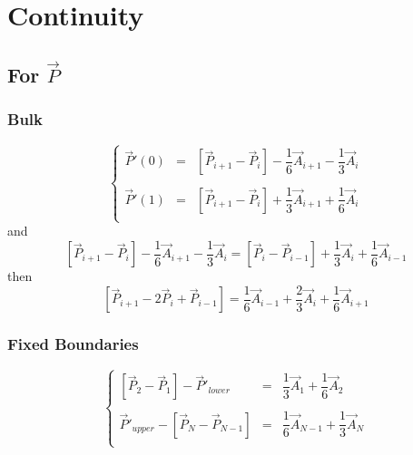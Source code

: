 \documentclass[aps,12pt]{revtex4}
\begin{document}
\section{Continuity}

\subsection{For $\vec{P}$}

\subsubsection{Bulk}

\begin{equation}
\left\lbrace
\begin{array}{rcl}
	\vec{P}'(0) & = & \left[\vec{P}_{i+1}-\vec{P}_i\right] - \dfrac{1}{6} \vec{A}_{i+1} - \dfrac{1}{3}\vec{A}_{i} \\
	\\
	\vec{P}'(1) & = & \left[\vec{P}_{i+1}-\vec{P}_i\right] + \dfrac{1}{3} \vec{A}_{i+1} + \dfrac{1}{6}\vec{A}_{i}\\
\end{array}
\right.
\end{equation}
and
\begin{equation}
	 \left[\vec{P}_{i+1}-\vec{P}_i\right] - \dfrac{1}{6} \vec{A}_{i+1} - \dfrac{1}{3}\vec{A}_{i}
	 =
	 \left[\vec{P}_{i}-\vec{P}_{i-1}\right] + \dfrac{1}{3} \vec{A}_{i} + \dfrac{1}{6}\vec{A}_{i-1}
\end{equation}
then
\begin{equation}
	 \left[\vec{P}_{i+1}-2\vec{P}_i+\vec{P}_{i-1}\right] = \dfrac{1}{6} \vec{A}_{i-1} + \dfrac{2}{3}\vec{A}_{i} + \dfrac{1}{6} \vec{A}_{i+1}
\end{equation}

\subsubsection{Fixed Boundaries}
 
\begin{equation}
\left\lbrace
\begin{array}{rcl}
 	 \left[\vec{P}_{2}-\vec{P}_1\right] - \vec{P}'_{lower}& = &\dfrac{1}{3} \vec{A}_1 + \dfrac{1}{6} \vec{A}_{2}\\
	 \\
	\vec{P}'_{upper} - \left[\vec{P}_N - \vec{P}_{N-1}\right] & = & \dfrac{1}{6} \vec{A}_{N-1} + \dfrac{1}{3} \vec{A}_{N}\\
\end{array}
\right.
\end{equation}
 
\end{document}
